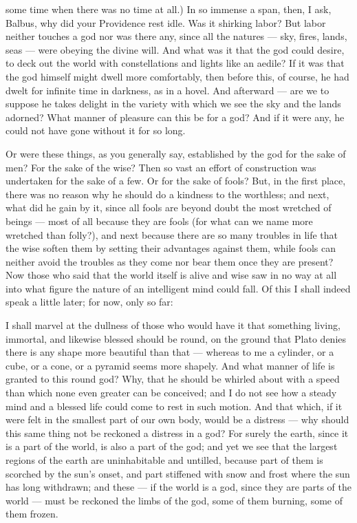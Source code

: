  some time when there was no time at all.) In so immense a span, then, I ask, Balbus, why did your Providence rest idle. Was it shirking labor? But labor neither touches a god nor was there any, since all the natures — sky, fires, lands, seas — were obeying the divine will. And what was it that the god could desire, to deck out the world with constellations and lights like an aedile? If it was that the god himself might dwell more comfortably, then before this, of course, he had dwelt for infinite time in darkness, as in a hovel. And afterward — are we to suppose he takes delight in the variety with which we see the sky and the lands adorned? What manner of pleasure can this be for a god? And if it were any, he could not have gone without it for so long.

 Or were these things, as you generally say, established by the god for the sake of men? For the sake of the wise? Then so vast an effort of construction was undertaken for the sake of a few. Or for the sake of fools? But, in the first place, there was no reason why he should do a kindness to the worthless; and next, what did he gain by it, since all fools are beyond doubt the most wretched of beings — most of all because they are fools (for what can we name more wretched than folly?), and next because there are so many troubles in life that the wise soften them by setting their advantages against them, while fools can neither avoid the troubles as they come nor bear them once they are present? Now those who said that the world itself is alive and wise saw in no way at all into what figure the nature of an intelligent mind could fall. Of this I shall indeed speak a little later; for now, only so far:

 I shall marvel at the dullness of those who would have it that something living, immortal, and likewise blessed should be round, on the ground that Plato denies there is any shape more beautiful than that — whereas to me a cylinder, or a cube, or a cone, or a pyramid seems more shapely. And what manner of life is granted to this round god? Why, that he should be whirled about with a speed than which none even greater can be conceived; and I do not see how a steady mind and a blessed life could come to rest in such motion. And that which, if it were felt in the smallest part of our own body, would be a distress — why should this same thing not be reckoned a distress in a god? For surely the earth, since it is a part of the world, is also a part of the god; and yet we see that the largest regions of the earth are uninhabitable and untilled, because part of them is scorched by the sun's onset, and part stiffened with snow and frost where the sun has long withdrawn; and these — if the world is a god, since they are parts of the world — must be reckoned the limbs of the god, some of them burning, some of them frozen.

